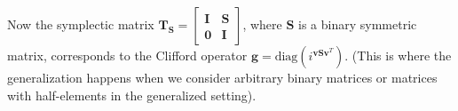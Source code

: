\documentclass{article}
\begin{document}
	Now the symplectic matrix $\mathbf{T}_\mathbf{S} = \begin{bmatrix} \mathbf{I} & \mathbf{S} \\ \mathbf{0} & \mathbf{I} \end{bmatrix}$, where $\mathbf{S}$ is a binary symmetric matrix, corresponds to the Clifford operator $\mathbf{g} = \text{diag}(i^{\mathbf{v}\mathbf{S}\mathbf{v}^T})$. (This is where the generalization happens when we consider arbitrary binary matrices or matrices with half-elements in the generalized setting).
	
	
	
\end{document}
